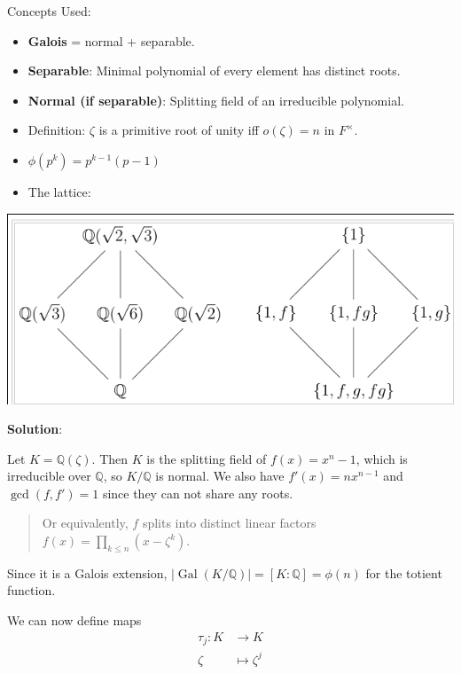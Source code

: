 \begin{solution}

Concepts Used:

\begin{itemize}
\item
  \textbf{Galois} = normal + separable.
\item
  \textbf{Separable}: Minimal polynomial of every element has distinct
  roots.
\item
  \textbf{Normal (if separable)}: Splitting field of an irreducible
  polynomial.
\item
  Definition: \(\zeta\) is a primitive root of unity iff
  \(o(\zeta) = n\) in \(F^{\times}\).
\item
  \(\phi(p^k) = p^{k-1}(p-1)\)
\item
  The lattice:
\end{itemize}

\includegraphics{figures/2019-12-24-13-19-15.png}

\textbf{Solution}:

Let \(K = {\mathbb{Q}}(\zeta)\). Then \(K\) is the splitting field of
\(f(x) = x^n - 1\), which is irreducible over \({\mathbb{Q}}\), so
\(K/{\mathbb{Q}}\) is normal. We also have \(f'(x) = nx^{n-1}\) and
\(\gcd(f, f') = 1\) since they can not share any roots.

\begin{quote}
Or equivalently, \(f\) splits into distinct linear factors
\(f(x) = \prod_{k\leq n}(x-\zeta^k)\).
\end{quote}

Since it is a Galois extension,
\({\left\lvert {\operatorname{Gal}(K/{\mathbb{Q}})} \right\rvert} = [K: {\mathbb{Q}}] = \phi(n)\)
for the totient function.

We can now define maps
\begin{align*}
\tau_j: K &\to K \\
\zeta &\mapsto \zeta^j 
\end{align*}


\end{solution}
